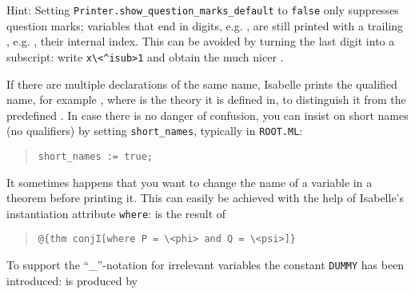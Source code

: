 \begin{isabellebody}
\begin{isamarkuptext}
Hint: Setting \verb|Printer.show_question_marks_default| to \texttt{false} only
suppresses question marks; variables that end in digits,
e.g. , are still printed with a trailing ,
e.g. , their internal index. This can be avoided by
turning the last digit into a subscript: write \verb!x\<^isub>1! and
obtain the much nicer .%
\end{isamarkuptext}%
\isamarkuptrue%
%
\isamarkuptrue%
%
\begin{isamarkuptext}%
If there are multiple declarations of the same name, Isabelle prints
the qualified name, for example , where  is the
theory it is defined in, to distinguish it from the predefined . In case there is no danger of confusion, you can insist on
short names (no qualifiers) by setting \verb!short_names!, typically
in \texttt{ROOT.ML}:
\begin{quote}
\verb|short_names := true|\verb!;!
\end{quote}%
\end{isamarkuptext}%
\isamarkuptrue%
%
\isamarkuptrue%
%
\begin{isamarkuptext}%
It sometimes happens that you want to change the name of a
variable in a theorem before printing it. This can easily be achieved
with the help of Isabelle's instantiation attribute \texttt{where}:
 is the result of
\begin{quote}
\verb!@!\verb!{thm conjI[where P = \<phi> and Q = \<psi>]}!
\end{quote}
To support the ``\_''-notation for irrelevant variables
the constant \texttt{DUMMY} has been introduced:
 is produced by

\end{isamarkuptext}
\end{isabellebody}
